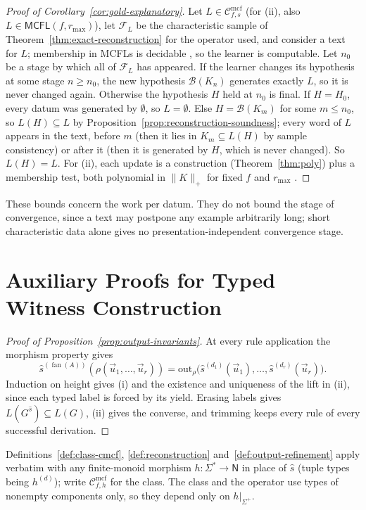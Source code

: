 \documentclass[11pt]{article}
\numberwithin{equation}{section}
\theoremstyle{plain}
\theoremstyle{definition}
\theoremstyle{remark}
\newcommand{\Cmcf}[2]{\mathcal{C}^{\mathrm{mcf}}_{#1,#2}}
\newcommand{\out}{\mathrm{out}}
\newcommand{\tuple}[1]{\vec{#1}}
\newcommand{\fan}{\operatorname{fan}}
\begin{document}
\begin{proof}[Proof of Corollary~\ref{cor:gold-explanatory}]
Let $L\in\Cmcf{f}{s}$ (for (ii), also $L\in\mathsf{MCFL}(f,r_{\max})$), let $\mathcal F_L$
be the characteristic sample of Theorem~\ref{thm:exact-reconstruction} for the
operator used, and consider a text for $L$; membership in MCFLs is decidable
\cite{SekiEtAl1991}, so the learner is computable.  Let $n_0$ be a stage by which all
of $\mathcal F_L$ has appeared.  If the learner changes its hypothesis at some stage
$n\ge n_0$, the new hypothesis $\mathcal B(K_n)$ generates exactly $L$, so it is never
changed again.  Otherwise the hypothesis $H$ held at $n_0$ is final.  If $H=H_0$, every
datum was generated by $\emptyset$, so $L=\emptyset$.  Else $H=\mathcal B(K_m)$ for some
$m\le n_0$, so $L(H)\subseteq L$ by Proposition~\ref{prop:reconstruction-soundness};
every word of $L$ appears in the text, before $m$ (then it lies in $K_m\subseteq L(H)$
by sample consistency) or after it (then it is generated by $H$, which is never
changed).  So $L(H)=L$.  For (ii), each update is a construction
(Theorem~\ref{thm:poly}) plus a membership test, both polynomial in $\|K\|_+$ for fixed
$f$ and $r_{\max}$ \cite[Proposition~4]{Yoshinaka2011}.
\end{proof}

These bounds concern the work per datum.  They do not bound the stage of convergence,
since a text may postpone any example arbitrarily long; short characteristic data alone
gives no presentation-independent convergence stage.

\section{Auxiliary Proofs for Typed Witness Construction}
\label{app:typed-witness-aux-proofs}

\begin{proof}[Proof of Proposition~\ref{prop:output-invariants}]
At every rule application the morphism property gives
\[
 \widehat s^{(\fan(A))}(\rho(\tuple u_1,\ldots,\tuple u_r))=
 \out_\rho\bigl(\widehat s^{(d_1)}(\tuple u_1),\ldots,\widehat s^{(d_r)}(\tuple u_r)\bigr).
\]  Induction on height gives (i) and the existence and uniqueness
of the lift in (ii), since each typed label is forced by its yield.  Erasing labels gives
$L(G^{\widehat s})\subseteq L(G)$, (ii) gives the converse, and trimming keeps every rule
of every successful derivation.
\end{proof}

Definitions~\ref{def:class-cmcf}, \ref{def:reconstruction}
and~\ref{def:output-refinement} apply verbatim with any finite-monoid morphism
$h:\Sigma^*\to\mathsf N$ in place of $\widehat s$ (tuple types being $h^{(d)}$); write
$\Cmcf{f}{h}$ for the class.  The class and the operator use types of nonempty
components only, so they depend only on $h|_{\Sigma^+}$.
\end{document}
